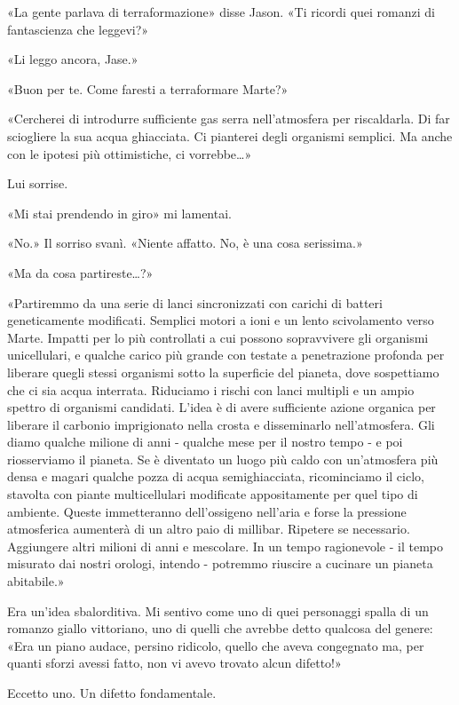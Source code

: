 «La gente parlava di terraformazione» disse Jason. «Ti ricordi quei
romanzi di fantascienza che leggevi?»

«Li leggo ancora, Jase.»

«Buon per te. Come faresti a terraformare Marte?»

«Cercherei di introdurre sufficiente gas serra nell'atmosfera per
riscaldarla. Di far sciogliere la sua acqua ghiacciata. Ci pianterei
degli organismi semplici. Ma anche con le ipotesi più ottimistiche, ci
vorrebbe\ldots»

Lui sorrise.

«Mi stai prendendo in giro» mi lamentai.

«No.» Il sorriso svanì. «Niente affatto. No, è una cosa serissima.»

«Ma da cosa partireste\ldots?»

«Partiremmo da una serie di lanci sincronizzati con carichi di batteri
geneticamente modificati. Semplici motori a ioni e un lento scivolamento
verso Marte. Impatti per lo più controllati a cui possono sopravvivere
gli organismi unicellulari, e qualche carico più grande con testate a
penetrazione profonda per liberare quegli stessi organismi sotto la
superficie del pianeta, dove sospettiamo che ci sia acqua interrata.
Riduciamo i rischi con lanci multipli e un ampio spettro di organismi
candidati. L'idea è di avere sufficiente azione organica per liberare il
carbonio imprigionato nella crosta e disseminarlo nell'atmosfera. Gli
diamo qualche milione di anni - qualche mese per il nostro tempo - e poi
riosserviamo il pianeta. Se è diventato un luogo più caldo con
un'atmosfera più densa e magari qualche pozza di acqua semighiacciata,
ricominciamo il ciclo, stavolta con piante multicellulari modificate
appositamente per quel tipo di ambiente. Queste immetteranno
dell'ossigeno nell'aria e forse la pressione atmosferica aumenterà di un
altro paio di millibar. Ripetere se necessario. Aggiungere altri milioni
di anni e mescolare. In un tempo ragionevole - il tempo misurato dai
nostri orologi, intendo - potremmo riuscire a cucinare un pianeta
abitabile.»

Era un'idea sbalorditiva. Mi sentivo come uno di quei personaggi spalla
di un romanzo giallo vittoriano, uno di quelli che avrebbe detto
qualcosa del genere: «Era un piano audace, persino ridicolo, quello che
aveva congegnato ma, per quanti sforzi avessi fatto, non vi avevo
trovato alcun difetto!»

Eccetto uno. Un difetto fondamentale.

